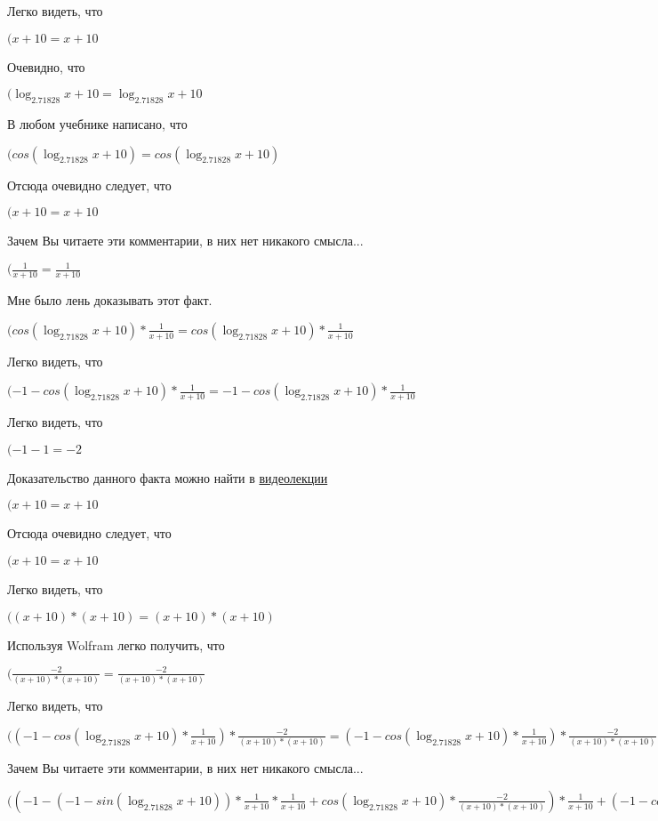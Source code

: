 \documentclass[12pt,a4paper,fleqn]{article}
\theoremstyle{definition}
\begin{document}
Легко видеть, что

$( x  +  10  =  x  +  10 $

Очевидно, что

$(\log_{ 2.71828 }{ x  +  10 } = \log_{ 2.71828 }{ x  +  10 }$

В любом учебнике написано, что

$(cos(\log_{ 2.71828 }{ x  +  10 }) = cos(\log_{ 2.71828 }{ x  +  10 })$

Отсюда очевидно следует, что

$( x  +  10  =  x  +  10 $

Зачем Вы читаете эти комментарии, в них нет никакого смысла...

$(\frac{ 1 }{ x  +  10 }
 = \frac{ 1 }{ x  +  10 }
$

Мне было лень доказывать этот факт.

$(cos(\log_{ 2.71828 }{ x  +  10 }) * \frac{ 1 }{ x  +  10 }
 = cos(\log_{ 2.71828 }{ x  +  10 }) * \frac{ 1 }{ x  +  10 }
$

Легко видеть, что

$( -1  - cos(\log_{ 2.71828 }{ x  +  10 }) * \frac{ 1 }{ x  +  10 }
 =  -1  - cos(\log_{ 2.71828 }{ x  +  10 }) * \frac{ 1 }{ x  +  10 }
$

Легко видеть, что

$( -1  -  1  =  -2 $

Доказательство данного факта можно найти в \href{https://www.youtube.com/watch?v=dQw4w9WgXcQ}{видеолекции}

$( x  +  10  =  x  +  10 $

Отсюда очевидно следует, что

$( x  +  10  =  x  +  10 $

Легко видеть, что

$(( x  +  10 ) * ( x  +  10 ) = ( x  +  10 ) * ( x  +  10 )$

Используя Wolfram легко получить, что

$(\frac{ -2 }{( x  +  10 ) * ( x  +  10 )}
 = \frac{ -2 }{( x  +  10 ) * ( x  +  10 )}
$

Легко видеть, что

$(( -1  - cos(\log_{ 2.71828 }{ x  +  10 }) * \frac{ 1 }{ x  +  10 }
) * \frac{ -2 }{( x  +  10 ) * ( x  +  10 )}
 = ( -1  - cos(\log_{ 2.71828 }{ x  +  10 }) * \frac{ 1 }{ x  +  10 }
) * \frac{ -2 }{( x  +  10 ) * ( x  +  10 )}
$

Зачем Вы читаете эти комментарии, в них нет никакого смысла...

$(( -1  - ( -1  - sin(\log_{ 2.71828 }{ x  +  10 })) * \frac{ 1 }{ x  +  10 }
 * \frac{ 1 }{ x  +  10 }
 + cos(\log_{ 2.71828 }{ x  +  10 }) * \frac{ -2 }{( x  +  10 ) * ( x  +  10 )}
) * \frac{ 1 }{ x  +  10 }
 + ( -1  - cos(\log_{ 2.71828 }{ x  +  10 }) * \frac{ 1 }{ x  +  10 }
) * \frac{ -2 }{( x  +  10 ) * ( x  +  10 )}
 = ( -1  - ( -1  - sin(\log_{ 2.71828 }{ x  +  10 })) * \frac{ 1 }{ x  +  10 }
 * \frac{ 1 }{ x  +  10 }
 + cos(\log_{ 2.71828 }{ x  +  10 }) * \frac{ -2 }{( x  +  10 ) * ( x  +  10 )}
) * \frac{ 1 }{ x  +  10 }
 + ( -1  - cos(\log_{ 2.71828 }{ x  +  10 }) * \frac{ 1 }{ x  +  10 }
) * \frac{ -2 }{( x  +  10 ) * ( x  +  10 )}
$
\end{document}
